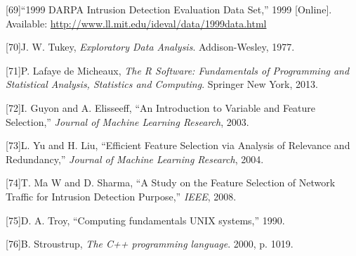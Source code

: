 \documentclass[11pt,]{article}
\begin{document}
{[}69{]}``1999 DARPA Intrusion Detection Evaluation Data Set,'' 1999
{[}Online{]}. Available:
\url{http://www.ll.mit.edu/ideval/data/1999data.html}

{[}70{]}J. W. Tukey, \emph{Exploratory Data Analysis}. Addison-Wesley,
1977.

{[}71{]}P. Lafaye de Micheaux, \emph{The R Software: Fundamentals of
Programming and Statistical Analysis, Statistics and Computing}.
Springer New York, 2013.

{[}72{]}I. Guyon and A. Elisseeff, ``An Introduction to Variable and
Feature Selection,'' \emph{Journal of Machine Learning Research}, 2003.

{[}73{]}L. Yu and H. Liu, ``Efficient Feature Selection via Analysis of
Relevance and Redundancy,'' \emph{Journal of Machine Learning Research},
2004.

{[}74{]}T. Ma W and D. Sharma, ``A Study on the Feature Selection of
Network Traffic for Intrusion Detection Purpose,'' \emph{IEEE}, 2008.

{[}75{]}D. A. Troy, ``Computing fundamentals UNIX systems,'' 1990.

{[}76{]}B. Stroustrup, \emph{The C++ programming language}. 2000, p.
1019.
\end{document}
